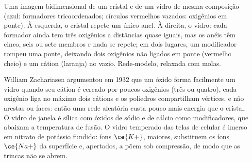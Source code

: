 \begin{omfigure}

{\small Uma imagem bidimensional de um cristal e de um vidro de mesma
composição (azul: formadores tricoordenados; círculos vermelhos vazados: oxigênios
em ponte). À esquerda, o cristal repete um único anel. À direita, o vidro: cada formador
ainda tem três oxigênios a distâncias quase iguais, mas os anéis têm cinco,
seis ou sete membros e nada se repete; em dois lugares, um modificador rompeu uma
ponte, deixando dois oxigênios não ligados em ponte (vermelho cheio) e um cátion (laranja) no
vazio. Rede-modelo, relaxada com molas.}
\end{omfigure}

William Zachariasen argumentou em 1932 que um óxido forma facilmente um vidro quando seu
cátion é cercado por poucos oxigênios (três ou quatro), cada oxigênio liga no máximo
dois cátions e os poliedros compartilham vértices, e não arestas ou faces: então uma
rede aleatória custa pouco mais energia que o cristal. O vidro de janela é
sílica com óxidos de sódio e de cálcio como modificadores, que abaixam a temperatura
de fusão. O vidro temperado das telas de celular é imerso em nitrato de potássio
fundido: íons $\ce{K+}$, maiores, substituem os íons $\ce{Na+}$ da superfície e, apertados,
a põem sob compressão, de modo que as trincas não se abrem.

